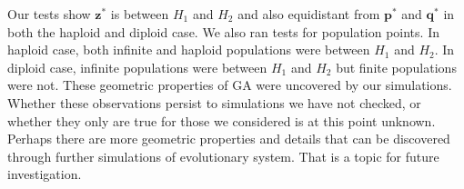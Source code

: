 Our tests show $\bm{z}^\ast$ is between $H_1$ and $H_2$ 
and also equidistant from $\bm{p}^\ast$ and $\bm{q}^\ast$ in both the haploid and diploid case. 
We also ran tests for population points. In haploid case, 
both infinite and haploid populations were between $H_1$ and $H_2$. 
In diploid case, infinite populations were between $H_1$ and $H_2$ but finite populations were not. 
These geometric properties of GA were uncovered by our simulations. 
Whether these observations persist to simulations we have not checked, or whether they only are true for those we considered is at this point unknown. 
Perhaps there are more geometric properties and details that can be discovered through further simulations of evolutionary system.
That is a topic for future investigation.




